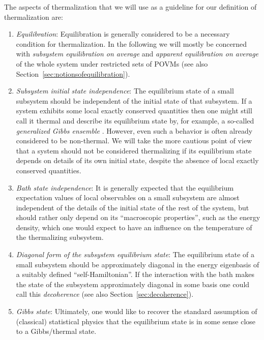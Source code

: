 \documentclass[a4paper,12pt,listof=totoc,index=totoc,bibliography=totoc,headsepline=false,headings=normal,BCOR16.153846mm,DIV12,headinclude,twoside,cleardoublepage=empty,numbers=noenddot,final]{scrreprt}
\theoremstyle{mystyle}
\numberwithin{equation}{section}
\numberwithin{figure}{section}
\numberwithin{lemma}{section}
\numberwithin{theorem}{section}
\numberwithin{corollary}{section}
\numberwithin{definition}{section}
\numberwithin{conjecture}{section}
\numberwithin{observation}{section}
\newcommand{\+}{\mkern2mu}
\DeclareMathOperator{\1}{\mathds{1}}
\begin{document}
The aspects of thermalization that we will use as a guideline for our definition of thermalization are:
\begin{enumerate}
\item \label{item:thermalizationconditions:equilibration} \emph{Equilibration}:
  Equilibration is generally considered to be a necessary condition for thermalization.
  In the following we will mostly be concerned with \emph{subsystem equilibration on average} and \emph{apparent equilibration on average} of the whole system under restricted sets of POVMs (see also Section~\ref{sec:notionsofequilibration}).
\item \label{item:thermalizationconditions:subsysteminitialstateindependece} \emph{Subsystem initial state independence}:
  The equilibrium state of a small subsystem should be independent of the initial state of that subsystem.
  If a system exhibits some local exactly conserved quantities then one might still call it thermal and describe its equilibrium state by, for example, a so-called \emph{generalized Gibbs ensemble} \cite{Jaynes,PhysRev.108.17,Rigol07}.
  However, even such a behavior is often already considered to be non-thermal.
  We will take the more cautious point of view that a system should not be considered thermalizing if its equilibrium state depends on details of its own initial state, despite the absence of local exactly conserved quantities.
\item \label{item:thermalizationconditions:bathstateindependence} \emph{Bath state independence}:
  It is generally expected that the equilibrium expectation values of local observables on a small subsystem are almost independent of the details of the initial state of the rest of the system, but should rather only depend on its ``macroscopic properties'', such as the energy density, which one would expect to have an influence on the temperature of the thermalizing subsystem.
\item \label{item:thermalizationconditions:diafonalform} \emph{Diagonal form of the subsystem equilibrium state}:
  The equilibrium state of a small subsystem should be approximately diagonal in the energy eigenbasis of a suitably defined ``self-Hamiltonian''.
  If the interaction with the bath makes the state of the subsystem approximately diagonal in some basis one could call this \emph{decoherence} (see also Section~\ref{sec:decoherence}).
\item \label{item:thermalizationconditions:gibbsstate} \emph{Gibbs state}:
  Ultimately, one would like to recover the standard assumption of (classical) statistical physics that the equilibrium state is in some sense close to a Gibbs/thermal state.
\end{enumerate}
\end{document}

